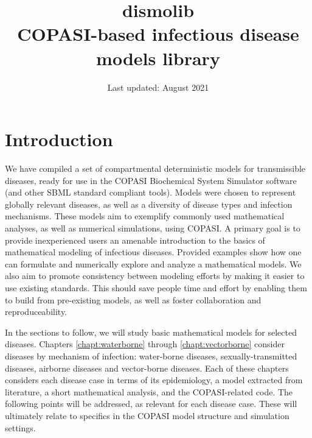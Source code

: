 \documentclass{book}\usepackage[]{graphicx}\usepackage[]{color}
\title{\textbf{dismolib}\\
COPASI-based infectious disease models library}
\author{}
\date{Last updated: August 2021}
\begin{document}
\maketitle

\tableofcontents

\chapter{Introduction}
\label{chapt:intro}


We have compiled a set of compartmental deterministic models for transmissible diseases, ready for use in the COPASI Biochemical System Simulator software (and other SBML standard compliant tools). Models were chosen to represent globally relevant diseases, as well as a diversity of disease types and infection mechanisms. These models aim to exemplify commonly used mathematical analyses, as well as numerical simulations, using COPASI. A primary goal is to provide inexperienced users an amenable introduction to the basics of mathematical modeling of infectious diseases. Provided examples show how one can formulate and numerically explore and analyze a mathematical models. We also aim to promote consistency between modeling efforts by making it easier to use existing standards. This should save people time and effort by enabling them to build from pre-existing models, as well as foster collaboration and reproduceability.

In the sections to follow, we will study basic mathematical models for selected diseases. Chapters \ref{chapt:waterborne} through \ref{chapt:vectorborne} consider diseases by mechanism of infection: water-borne diseases, sexually-transmitted diseases, airborne diseases and vector-borne diseases. Each of these chapters considers each disease case in terms of its epidemiology, a model extracted from literature, a short mathematical analysis, and the COPASI-related code. The following points will be addressed, as relevant for each disease case. These will ultimately relate to specifics in the COPASI model structure and simulation settings.
\end{document}
